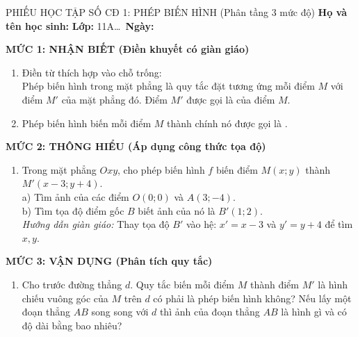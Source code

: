 \documentclass[12pt, a4paper]{article}
\begin{document}
\begin{pedabox}{PHIẾU HỌC TẬP SỐ CĐ 1: PHÉP BIẾN HÌNH (Phân tầng 3 mức độ)}
\textbf{Họ và tên học sinh:} \dotfill \textbf{Lớp:} 11A\dots \ \textbf{Ngày:} \dotfill

\textbf{MỨC 1: NHẬN BIẾT (Điền khuyết có giàn giáo)}
\begin{enumerate}[leftmargin=0.5cm]
    \item Điền từ thích hợp vào chỗ trống:\\
    Phép biến hình trong mặt phẳng là quy tắc đặt tương ứng mỗi điểm $M$ với \dotfill điểm $M'$ của mặt phẳng đó. Điểm $M'$ được gọi là \dotfill của điểm $M$.
    \item Phép biến hình biến mỗi điểm $M$ thành chính nó được gọi là \dotfill.
\end{enumerate}

\textbf{MỨC 2: THÔNG HIỂU (Áp dụng công thức tọa độ)}
\begin{enumerate}[leftmargin=0.5cm]
    \item Trong mặt phẳng $Oxy$, cho phép biến hình $f$ biến điểm $M(x; y)$ thành $M'(x - 3; y + 4)$.\\
    a) Tìm ảnh của các điểm $O(0; 0)$ và $A(3; -4)$.\\
    b) Tìm tọa độ điểm gốc $B$ biết ảnh của nó là $B'(1; 2)$.\\
    \textit{Hướng dẫn giàn giáo:} Thay tọa độ $B'$ vào hệ: $x' = x - 3$ và $y' = y + 4$ để tìm $x, y$.
\end{enumerate}

\textbf{MỨC 3: VẬN DỤNG (Phân tích quy tắc)}
\begin{enumerate}[leftmargin=0.5cm]
    \item Cho trước đường thẳng $d$. Quy tắc biến mỗi điểm $M$ thành điểm $M'$ là hình chiếu vuông góc của $M$ trên $d$ có phải là phép biến hình không? Nếu lấy một đoạn thẳng $AB$ song song với $d$ thì ảnh của đoạn thẳng $AB$ là hình gì và có độ dài bằng bao nhiêu?
\end{enumerate}
\end{pedabox}

\vspace{8pt}
\end{document}
